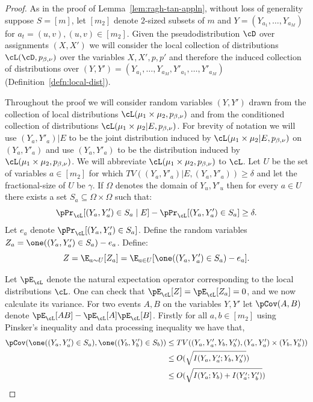 \begin{proof}
As in the proof of Lemma~\ref{lem:ragh-tan-appln}, without loss of generality suppose $S = [m]$, let $[m_2]$ denote $2$-sized subsets of $m$ and $Y = (Y_{a_1},\ldots,Y_{a_M})$ for $a_t = (u,v), (u,v) \in [m_2]$. Given the pseudodistribution $\cD$ over assignments $(X,X')$ we will consider the local collection of distributions $\cL(\cD, p_{\beta,\nu})$ over the variables $X,X',p,p'$ and therefore the induced collection of distributions over $(Y,Y') = (Y_{a_1},\ldots,Y_{a_M},Y'_{a_1},\ldots,Y'_{a_M})$ (Definition~\ref{defn:local-dist}).

Throughout the proof we will consider random variables $(Y,Y')$ drawn from the collection of local distributions $\cL(\mu_1 \times \mu_2,p_{\beta,\nu})$ and from the conditioned collection of distributions $\cL(\mu_1 \times \mu_2 | E,p_{\beta,\nu})$. For brevity of notation we will use $(Y_a,Y'_a)|E$ to be the joint distribution induced by $\cL(\mu_1 \times \mu_2 | E, p_{\beta,\nu})$ on $(Y_a,Y'_a)$ and use $(Y_a,Y'_a)$ to be the distribution induced by $\cL(\mu_1 \times \mu_2,p_{\beta,\nu})$. We will abbreviate $\cL(\mu_1 \times \mu_2,p_{\beta,\nu})$ to $\cL$. Let $U$ be the set of variables $a \in [m_2]$ for which $TV((Y_a,Y'_a)|E , (Y_a,Y'_a)) \geq \delta$ and let the fractional-size of $U$ be $\gamma$. If $\Omega$ denotes the domain of $Y_u, Y'_u$ then for every $a \in U$ there exists a set $S_a \subseteq \Omega \times \Omega$ such that: 
\begin{equation}\label{eq:e-tv}
\pPr_{\cL}[(Y_a,Y'_a) \in S_a \mid E] - \pPr_{\cL}[(Y_a,Y'_a) \in S_a] \geq \delta.
\end{equation}
Let $e_a$ denote  $\pPr_{\cL}[(Y_a,Y'_a) \in S_a]$. Define the random variables $Z_a = \one((Y_a,Y'_a) \in S_a) - e_a$. Define:
\[Z = \E_{a \sim U}[Z_a] = \E_{a \in U}[\one((Y_a,Y'_a) \in S_a) - e_a].\]

Let $\pE_{\cL}$ denote the natural expectation operator corresponding to the local distributions $\cL$. 
One can check that $\pE_{\cL}[Z] = \pE_{\cL}[Z_a] = 0$, and we now calculate its variance. For two events $A,B$ on the variables $Y,Y'$ let $\pCov(A,B)$ denote $\pE_{\cL}[AB] - \pE_{\cL}[A]\pE_{\cL}[B]$. Firstly for all $a,b \in [m_2]$  using Pinsker's inequality and data processing inequality we have that,
\begin{align*}
\pCov(\one((Y_a,Y'_a) \in S_a),\one((Y_b,Y'_b) \in S_b)) 
&\leq TV((Y_a,Y'_a,Y_b,Y'_b), (Y_a,Y'_a)\times (Y_b,Y'_b)) \\ &\leq O(\sqrt{I(Y_a,Y'_a;Y_b,Y'_b)}) \\
&\leq O(\sqrt{I(Y_a;Y_b) + I(Y'_a;Y'_b)})
\end{align*}


\end{proof}
